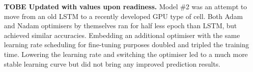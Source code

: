%
%
\textbf{TOBE Updated with values upon readiness.}
Model \#2 was an attempt to move from an old LSTM to a recently developed GPU type of cell.
Both Adam and Nadam optimisers by themselves ran for half less epoch than LSTM, but achieved similar accuracies.
Embedding an additional optimiser with the same learning rate scheduling for fine-tuning purposes doubled and tripled the training time.
Lowering the learning rate and switching the optimiser led to a much more stable learning curve but did not bring any improved prediction results.

